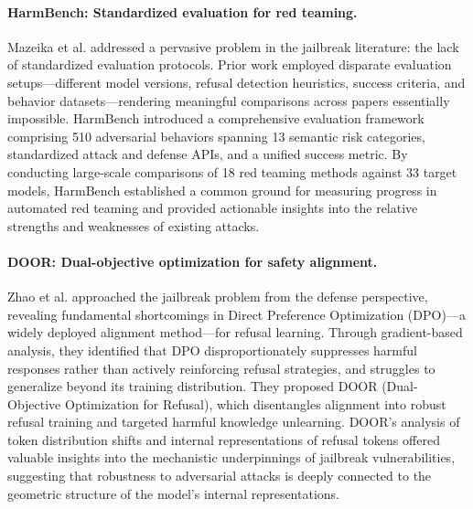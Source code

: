 \documentclass[preprint,12pt]{elsarticle}
\begin{document}
\paragraph{HarmBench: Standardized evaluation for red teaming.} Mazeika et al. \cite{mazeika2024harmbench} addressed a pervasive problem in the jailbreak literature: the lack of standardized evaluation protocols. Prior work employed disparate evaluation setups---different model versions, refusal detection heuristics, success criteria, and behavior datasets---rendering meaningful comparisons across papers essentially impossible. HarmBench introduced a comprehensive evaluation framework comprising 510 adversarial behaviors spanning 13 semantic risk categories, standardized attack and defense APIs, and a unified success metric. By conducting large-scale comparisons of 18 red teaming methods against 33 target models, HarmBench established a common ground for measuring progress in automated red teaming and provided actionable insights into the relative strengths and weaknesses of existing attacks.

\paragraph{DOOR: Dual-objective optimization for safety alignment.} Zhao et al. \cite{zhao2025door} approached the jailbreak problem from the defense perspective, revealing fundamental shortcomings in Direct Preference Optimization (DPO)---a widely deployed alignment method---for refusal learning. Through gradient-based analysis, they identified that DPO disproportionately suppresses harmful responses rather than actively reinforcing refusal strategies, and struggles to generalize beyond its training distribution. They proposed DOOR (Dual-Objective Optimization for Refusal), which disentangles alignment into robust refusal training and targeted harmful knowledge unlearning. DOOR's analysis of token distribution shifts and internal representations of refusal tokens offered valuable insights into the mechanistic underpinnings of jailbreak vulnerabilities, suggesting that robustness to adversarial attacks is deeply connected to the geometric structure of the model's internal representations.
\end{document}
